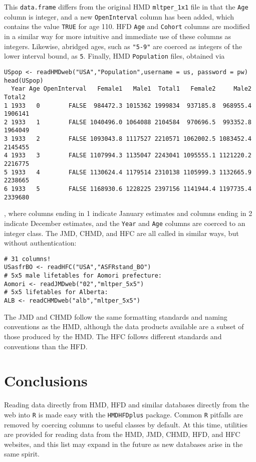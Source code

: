 \documentclass{article}
\begin{document}
This \texttt{data.frame} differs from the original HMD \texttt{mltper\_1x1} file
in that the \texttt{Age} column is integer, and a new \texttt{OpenInterval}
column has been added, which contains the value \texttt{TRUE} for age 110. HFD
\texttt{Age} and \texttt{Cohort} columns are modified in a similar way for more
intuitive and immediate use of these columns as integers. Likewise, abridged
ages, such as \texttt{"5-9"} are coerced as integers of the
lower interval bound, as \texttt{5}. Finally, HMD \texttt{Population} files, obtained via
\begin{small}
\begin{verbatim}
USpop <- readHMDweb("USA","Population",username = us, password = pw)
head(USpop)
  Year Age OpenInterval   Female1   Male1  Total1   Female2     Male2  Total2
1 1933   0        FALSE  984472.3 1015362 1999834  937185.8  968955.4 1906141
2 1933   1        FALSE 1040496.0 1064088 2104584  970696.5  993352.8 1964049
3 1933   2        FALSE 1093043.8 1117527 2210571 1062002.5 1083452.4 2145455
4 1933   3        FALSE 1107994.3 1135047 2243041 1095555.1 1121220.2 2216775
5 1933   4        FALSE 1130624.4 1179514 2310138 1105999.3 1132665.9 2238665
6 1933   5        FALSE 1168930.6 1228225 2397156 1141944.4 1197735.4 2339680
\end{verbatim}
\end{small}
, where columns ending in 1 indicate January  estimates and columns
ending in 2 indicate December  estimates, and the \texttt{Year} and
\texttt{Age} columns are coerced to an integer class. The JMD, CHMD, and HFC
are all called in similar ways, but without authentication:
\begin{small}
\begin{verbatim}
# 31 columns!
USasfrBO <- readHFC("USA","ASFRstand_BO")
# 5x5 male lifetables for Aomori prefecture:
Aomori <- readJMDweb("02","mltper_5x5")
# 5x5 lifetables for Alberta:
ALB <- readCHMDweb("alb","mltper_5x5")
\end{verbatim}
\end{small}
The JMD and CHMD follow the same formatting standards and naming conventions as
the HMD, although the data products available are a subset of those produced by
the HMD. The HFC follows different standards and conventions than the HFD.

\section{Conclusions}
Reading data directly from HMD, HFD and similar databases directly from the web
into \texttt{R} is made easy with the \texttt{HMDHFDplus} package. Common
\texttt{R} pitfalls are removed by coercing columns to useful classes by
default. At this time, utilities are provided for reading data from the HMD,
JMD, CHMD, HFD, and HFC websites, and this list may expand in the future as new
databases arise in the same spirit.
\end{document}
